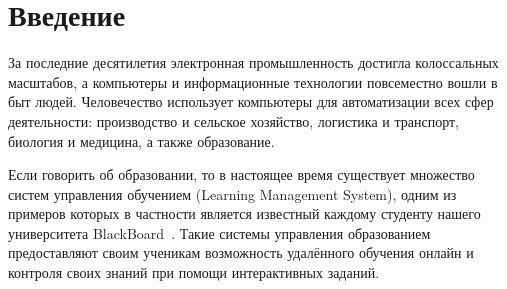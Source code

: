 \documentclass[14pt]{matmex-diploma-custom}
\begin{document}
\maketitle
\tableofcontents
\section*{Введение}
За последние десятилетия электронная промышленность достигла колоссальных масштабов, а компьютеры и информационные технологии повсеместно вошли в быт людей. Человечество использует компьютеры для автоматизации всех сфер деятельности: производство и сельское хозяйство, логистика и транспорт, биология и медицина, а также образование.

Если говорить об образовании, то в настоящее время существует множество систем управления обучением (Learning Management System), одним из примеров которых в частности является известный каждому студенту нашего университета BlackBoard~\cite{blackboard}. Такие системы управления образованием предоставляют своим ученикам возможность удалённого обучения онлайн и контроля своих знаний при помощи интерактивных заданий. 
\end{document}
